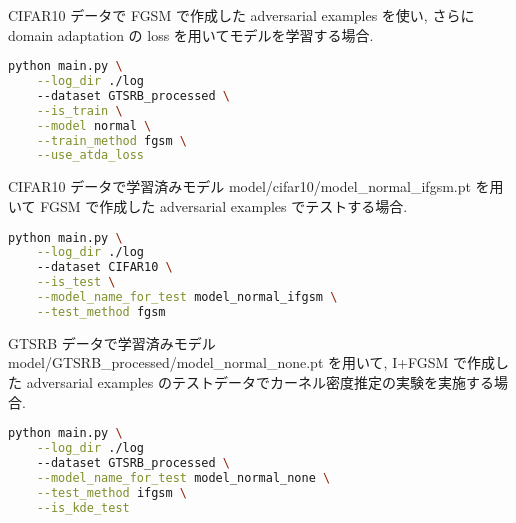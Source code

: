 CIFAR10 データで FGSM で作成した adversarial examples を使い, さらに domain adaptation の loss を用いてモデルを学習する場合.
%
\begin{lstlisting}[language=bash]
  python main.py \
    --log_dir ./log
    --dataset GTSRB_processed \
    --is_train \
    --model normal \
    --train_method fgsm \
    --use_atda_loss
\end{lstlisting}
%

CIFAR10 データで学習済みモデル model/cifar10/model\_normal\_ifgsm.pt を用いて FGSM で作成した adversarial examples でテストする場合.
%
\begin{lstlisting}[language=bash]
  python main.py \
    --log_dir ./log
    --dataset CIFAR10 \
    --is_test \
    --model_name_for_test model_normal_ifgsm \
    --test_method fgsm
\end{lstlisting}
%

GTSRB データで学習済みモデル model/GTSRB\_processed/model\_normal\_none.pt を用いて, I+FGSM で作成した adversarial examples のテストデータでカーネル密度推定の実験を実施する場合.
%
\begin{lstlisting}[language=bash]
  python main.py \
    --log_dir ./log
    --dataset GTSRB_processed \
    --model_name_for_test model_normal_none \
    --test_method ifgsm \
    --is_kde_test
\end{lstlisting}
%
